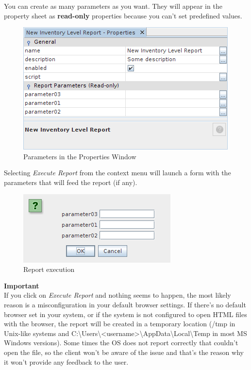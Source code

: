 \documentclass[a4paper]{article}
\begin{document}
			You can create as many parameters as you want. They will appear in the property sheet as \textbf{read-only} properties because you can't set predefined values.
			\begin{figure}[h!]
				\centering
				\includegraphics[scale=0.5]{img/reports_parameters.png}
				\caption{Parameters in the Properties Window}
				\label{fig:reports_parameters}
			\end{figure}
			\newpage
			Selecting \textit{Execute Report} from the context menu will launch a form with the parameters that will feed the report (if any).
			\begin{figure}[h!]
				\centering
				\includegraphics[scale=0.7]{img/reports_execute_report.png}
				\caption{Report execution}
				\label{fig:reports_execute_report}
			\end{figure}
	    
	    
	    \begin{framed} {\large \textbf{Important}} \\
	    	If you click on \textit{Execute Report} and nothing seems to happen, the most likely reason is a misconfiguration in your default browser settings. If there's no default browser set in your system, or if the system is not configured to open HTML files with the browser, the report will be created in a temporary location (/tmp in Unix-like systems and C:\textbackslash{}Users\textbackslash{}\textless{}username\textgreater\textbackslash{}AppData\textbackslash{}Local\textbackslash{}Temp in most MS Windows versions). Some times the OS does not report correctly that couldn't open the file, so the client won't be aware of the issue and that's the reason why it won't provide any feedback to the user. 
	    \end{framed}
	    
\end{document}
